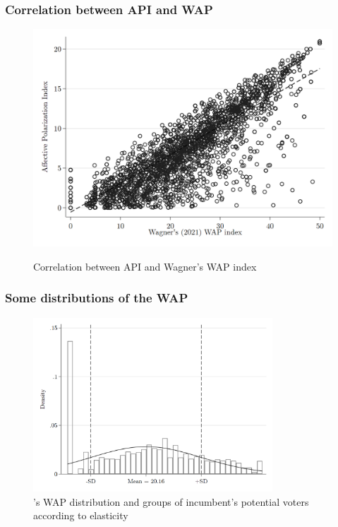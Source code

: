 \documentclass[a4paper, svgnames]{article}
\newcommand{\citeposs}[1]{\citeauthor{#1}'s \citeyearpar{#1}}
\begin{document}
\subsubsection{Correlation between API and WAP}

\begin{figure}[H]
	\centering
	\caption{Correlation between API and Wagner's WAP index}
	\includegraphics[width=\textwidth]{Figures/api_wagner_scatter.png}
	\label{fig:corr-api-wap}
\end{figure}

\subsubsection{Some distributions of the WAP}
\begin{figure}[H]
	\centering
	\caption{\citeposs{Wagner2021} WAP distribution and groups of incumbent's potential voters according to elasticity}
	\includegraphics[width=0.8\textwidth]{Figures/groupsHist_wagner.png}
\end{figure}
\end{document}
